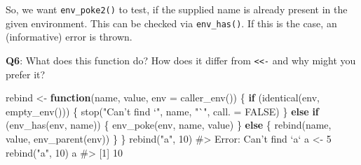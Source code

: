 \documentclass[
]{krantz}
\makeatletter
\newenvironment{Shaded}{\begin{snugshade}}{\end{snugshade}}
\newcommand{\CharTok}[1]{\textcolor[rgb]{0.31,0.60,0.02}{#1}}
\newcommand{\CommentTok}[1]{\textcolor[rgb]{0.56,0.35,0.01}{\textit{#1}}}
\newcommand{\ControlFlowTok}[1]{\textcolor[rgb]{0.13,0.29,0.53}{\textbf{#1}}}
\newcommand{\DataTypeTok}[1]{\textcolor[rgb]{0.13,0.29,0.53}{#1}}
\newcommand{\DecValTok}[1]{\textcolor[rgb]{0.00,0.00,0.81}{#1}}
\newcommand{\KeywordTok}[1]{\textcolor[rgb]{0.13,0.29,0.53}{\textbf{#1}}}
\newcommand{\NormalTok}[1]{#1}
\newcommand{\OperatorTok}[1]{\textcolor[rgb]{0.81,0.36,0.00}{\textbf{#1}}}
\newcommand{\OtherTok}[1]{\textcolor[rgb]{0.56,0.35,0.01}{#1}}
\newcommand{\StringTok}[1]{\textcolor[rgb]{0.31,0.60,0.02}{#1}}
\newenvironment{kframe}{%
\medskip{}
\setlength{\fboxsep}{.8em}
 \def\at@end@of@kframe{}%
 \ifinner\ifhmode%
  \def\at@end@of@kframe{\end{minipage}}%
  \begin{minipage}{\columnwidth}%
 \fi\fi%
 \def\FrameCommand##1{\hskip\@totalleftmargin \hskip-\fboxsep
 \colorbox{shadecolor}{##1}\hskip-\fboxsep
     \hskip-\linewidth \hskip-\@totalleftmargin \hskip\columnwidth}%
 \MakeFramed {\advance\hsize-\width
   \@totalleftmargin\z@ \linewidth\hsize
   \@setminipage}}%
 {\par\unskip\endMakeFramed%
 \at@end@of@kframe}
\renewenvironment{Shaded}{\begin{kframe}}{\end{kframe}}
\renewcommand{\KeywordTok} [1]{\textcolor[rgb]{0.00,0.44,0.13}{{#1}}}
\renewcommand{\DataTypeTok}[1]{\textcolor[rgb]{0.56,0.13,0.00}{{#1}}}
\renewcommand{\DecValTok}  [1]{\textcolor[rgb]{0.25,0.63,0.44}{{#1}}}
\renewcommand{\CharTok}    [1]{\textcolor[rgb]{0.25,0.44,0.63}{{#1}}}
\renewcommand{\StringTok}  [1]{\textcolor[rgb]{0.25,0.44,0.63}{{#1}}}
\renewcommand{\CommentTok} [1]{\textcolor[rgb]{0.38,0.63,0.69}{{#1}}}
\renewcommand{\OtherTok}   [1]{\textcolor[rgb]{0.00,0.44,0.13}{{#1}}}
\renewcommand{\NormalTok}  [1]{{#1}}
\makeatother
\begin{document}
So, we want \texttt{env\_poke2()} to test, if the supplied name is already present in the given environment. This can be checked via \texttt{env\_has()}. If this is the case, an (informative) error is thrown.

\begin{Shaded}
\end{Shaded}

\textbf{{Q6}}: What does this function do? How does it differ from \texttt{\textless{}\textless{}-} and why might you prefer it?

\begin{Shaded}
\begin{Highlighting}[]
\NormalTok{rebind <-}\StringTok{ }\ControlFlowTok{function}\NormalTok{(name, value, }\DataTypeTok{env =} \KeywordTok{caller_env}\NormalTok{()) \{}
  \ControlFlowTok{if}\NormalTok{ (}\KeywordTok{identical}\NormalTok{(env, }\KeywordTok{empty_env}\NormalTok{())) \{}
    \KeywordTok{stop}\NormalTok{(}\StringTok{"Can't find `"}\NormalTok{, name, }\StringTok{"`"}\NormalTok{, }\DataTypeTok{call. =} \OtherTok{FALSE}\NormalTok{)}
\NormalTok{  \} }\ControlFlowTok{else} \ControlFlowTok{if}\NormalTok{ (}\KeywordTok{env_has}\NormalTok{(env, name)) \{}
    \KeywordTok{env_poke}\NormalTok{(env, name, value)}
\NormalTok{  \} }\ControlFlowTok{else}\NormalTok{ \{}
    \KeywordTok{rebind}\NormalTok{(name, value, }\KeywordTok{env_parent}\NormalTok{(env))}
\NormalTok{  \}}
\NormalTok{\}}
\KeywordTok{rebind}\NormalTok{(}\StringTok{"a"}\NormalTok{, }\DecValTok{10}\NormalTok{)}
\CommentTok{#> Error: Can't find `a`}
\NormalTok{a <-}\StringTok{ }\DecValTok{5}
\KeywordTok{rebind}\NormalTok{(}\StringTok{"a"}\NormalTok{, }\DecValTok{10}\NormalTok{)}
\NormalTok{a}
\CommentTok{#> [1] 10}
\end{Highlighting}
\end{Shaded}
\end{document}
